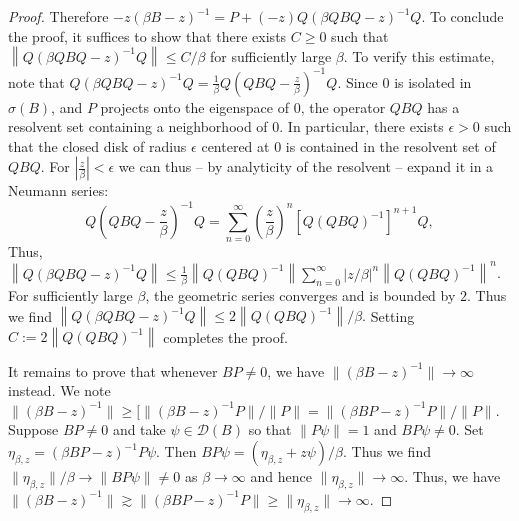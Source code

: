 \documentclass[reqno,12pt,letterpaper]{amsart}
\numberwithin{equation}{section}
\newcommand{\1}{\mathds{1}}
\theoremstyle{definition}
\begin{document}
\begin{proof}
	Therefore
	$
	-z (\beta B - z)^{-1} = P + (-z) Q (\beta Q B Q - z)^{-1} Q.
	$	
	To conclude the proof, it suffices to show that there exists $C \geq 0$ such that
	$
	\left\| Q (\beta Q B Q - z)^{-1} Q \right\| \leq C/\beta
	$
	for sufficiently large $\beta$.
	To verify this estimate, note that
	$
	Q (\beta Q B Q - z)^{-1} Q = \frac{1}{\beta} Q \left( Q B Q - \frac{z}{\beta} \right)^{-1} Q.
	$
	Since $0$ is isolated in $\sigma(B)$, and $P$ projects onto the eigenspace of $0$, the operator $Q B Q$ has a resolvent set containing a neighborhood of $0$. In particular, there exists $\epsilon > 0$ such that the closed disk of radius $\epsilon$ centered at $0$ is contained in the resolvent set of $Q B Q$.
	For $|\frac{z}{\beta}| < \epsilon$ we can thus -- by analyticity of the resolvent -- expand it in a Neumann series:
	\[
	Q \left( Q B Q - \frac{z}{\beta} \right)^{-1} Q = \sum_{n=0}^\infty \left( \frac{z}{\beta} \right)^n \left[ Q \left( Q B Q \right)^{-1} \right]^{n+1} Q,
	\]
	Thus,
		$
		\left\| Q (\beta Q B Q - z)^{-1} Q \right\| 
		\leq \frac{1}{\beta} \left\| Q (Q B Q)^{-1} \right\| \sum_{n=0}^\infty \left| z/\beta \right|^n \left\| Q (Q B Q)^{-1} \right\|^n$.
	For sufficiently large $\beta$, the geometric series converges and is bounded by $2$.
	Thus we find
	$
	\left\| Q (\beta Q B Q - z)^{-1} Q \right\| \leq 2 \left\| Q (Q B Q)^{-1} \right\|/\beta.
	$
	Setting
	$
	C := 2 \left\| Q (Q B Q)^{-1} \right\|
	$
	completes the proof.
	
	
	
	It remains to prove that whenever $B P \neq 0$, we have $\|(\beta B - z)^{-1} \| \rightarrow \infty$ instead. We note $\|(\beta B - z)^{-1} \| \geq [ \|(\beta B - z)^{-1}P \| /\|P\|= \|(\beta BP - z)^{-1}P \|/\|P\| $. Suppose $BP \neq 0$ and take $\psi \in \mathcal{D}(B)$ so that $\|P\psi\| = 1$ and $BP\psi \neq 0$. Set $\eta_{\beta,z} = (\beta BP -z)^{-1} P\psi$. Then $B P\psi = (\eta_{\beta,z} + z \psi)/\beta$. Thus we find $\|\eta_{\beta,z} \|/\beta \rightarrow  \|B P\psi\| \neq 0$ as $\beta \rightarrow \infty$ and hence $\|\eta_{\beta,z}\| \rightarrow \infty$. Thus, we have $\|(\beta B - z)^{-1} \| \gtrsim \|(\beta BP - z)^{-1}P \| \geq \|\eta_{\beta,z}\| \rightarrow \infty$.
	
\end{proof}
\end{document}
